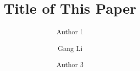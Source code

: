 \documentclass{amsart}
\begin{document}
%
%
\title[A Short Running Title]{Title of This Paper}%

\author{Author 1}
\address[A.~1]{School of Computer Science,\\ 
Xi'an Shiyou University, Shaanxi 710065, China}%

\author{Gang Li}
\address[A.~2]{School of Information Technology \\
Deakin University, Geelong, Australia}%

\author{Author 3}
\address[A.~3]{School of Information Technology \\
Deakin University, 221 Burwood Highway \\
Vic 3125, Australia}%

%


\date{\gitAuthorDate}%




\maketitle
\tableofcontents

\newpage









\newpage



\listoftodos
\end{document}
